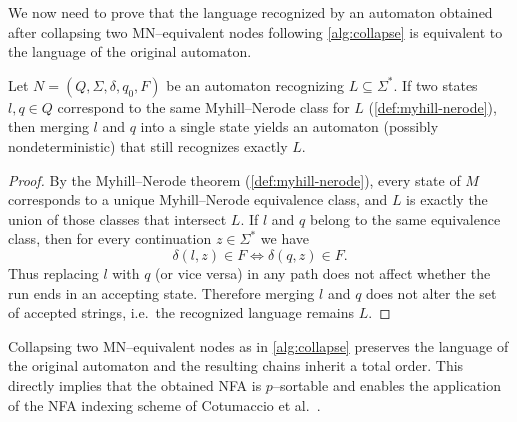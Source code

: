 
We now need to prove that the language recognized by an automaton obtained after collapsing two MN--equivalent nodes following \cref{alg:collapse} is equivalent to the language of the original automaton.

\begin{lemma} \label{lemma:language-eq}
Let $N=(Q,\Sigma,\delta,q_0,F)$ be an automaton recognizing $L \subseteq \Sigma^*$.
If two states $l,q \in Q$ correspond to the same Myhill--Nerode class for $L$ (\cref{def:myhill-nerode}), then merging $l$ and $q$ into a single state yields an automaton (possibly nondeterministic) that still recognizes exactly $L$.
\end{lemma}

\begin{proof}
By the Myhill--Nerode theorem (\cref{def:myhill-nerode}), every state of $M$ corresponds to a unique Myhill--Nerode equivalence class, and $L$ is exactly the union of those classes that intersect $L$.
If $l$ and $q$ belong to the same equivalence class, then for every continuation $z \in \Sigma^*$ we have
\[
\delta(l,z) \in F \iff \delta(q,z) \in F.
\]
Thus replacing $l$ with $q$ (or vice versa) in any path does not affect whether the run ends in an accepting state. Therefore merging $l$ and $q$ does not alter the set of accepted strings, i.e.\ the recognized language remains $L$.
\end{proof} 

Collapsing two MN--equivalent nodes as in \cref{alg:collapse} preserves the language of the original automaton and the resulting chains inherit a total order. This 
directly implies that the obtained NFA is $p$--sortable and 
enables the application of the NFA indexing scheme of Cotumaccio et al.~\cite{cotumaccio2023co}.